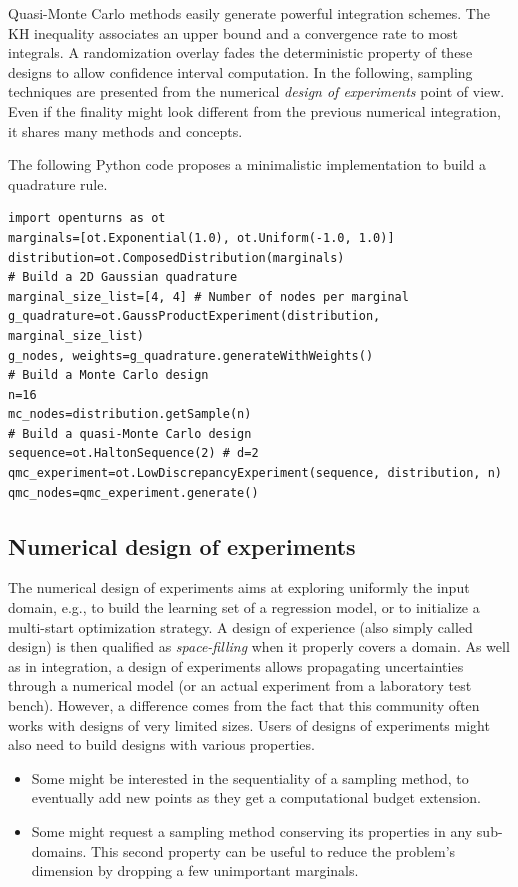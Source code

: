 Quasi-Monte Carlo methods easily generate powerful integration schemes. 
The KH inequality associates an upper bound and a convergence rate to most integrals. 
A randomization overlay fades the deterministic property of these designs to allow confidence interval computation.
In the following, sampling techniques are presented from the numerical \textit{design of experiments} point of view. 
Even if the finality might look different from the previous numerical integration, it shares many methods and concepts. 


\begin{otexample}
    The following Python code proposes a minimalistic \ot implementation to build a quadrature rule. 
\lstset{style=mystyle, language=python}
\begin{lstlisting}
import openturns as ot
marginals=[ot.Exponential(1.0), ot.Uniform(-1.0, 1.0)]
distribution=ot.ComposedDistribution(marginals)
# Build a 2D Gaussian quadrature
marginal_size_list=[4, 4] # Number of nodes per marginal
g_quadrature=ot.GaussProductExperiment(distribution, marginal_size_list)
g_nodes, weights=g_quadrature.generateWithWeights()
# Build a Monte Carlo design
n=16 
mc_nodes=distribution.getSample(n)
# Build a quasi-Monte Carlo design
sequence=ot.HaltonSequence(2) # d=2
qmc_experiment=ot.LowDiscrepancyExperiment(sequence, distribution, n)
qmc_nodes=qmc_experiment.generate()
\end{lstlisting}
\end{otexample}


\subsection{Numerical design of experiments}
The numerical design of experiments aims at exploring uniformly the input domain, e.g., to build the learning set of a regression model, or to initialize a multi-start optimization strategy. 
A design of experience (also simply called design) is then qualified as \textit{space-filling} when it properly covers a domain. 
As well as in integration, a design of experiments allows propagating uncertainties through a numerical model (or an actual experiment from a laboratory test bench). 
However, a difference comes from the fact that this community often works with designs of very limited sizes. 
Users of designs of experiments might also need to build designs with various properties. 
\begin{itemize}
    \item Some might be interested in the sequentiality of a sampling method, to eventually add new points as they get a computational budget extension.
    \item Some might request a sampling method conserving its properties in any sub-domains. 
    This second property can be useful to reduce the problem's dimension by dropping a few unimportant marginals.
\end{itemize}

